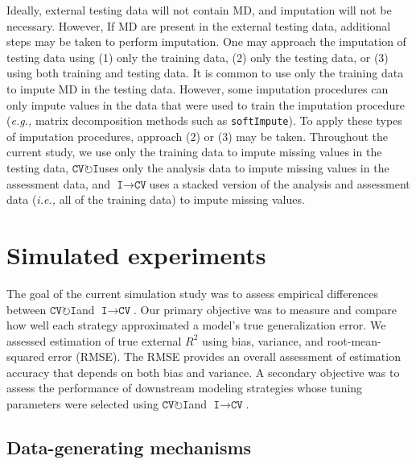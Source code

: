 \documentclass[AMA,STIX1COL,doublespace]{WileyNJD-v2}
\begin{document}
Ideally, external testing data will not contain MD, and imputation will
not be necessary. However, If MD are present in the external testing
data, additional steps may be taken to perform imputation. One may
approach the imputation of testing data using (1) only the training
data, (2) only the testing data, or (3) using both training and testing
data. It is common to use only the training data to impute MD in the
testing data. However, some imputation procedures can only impute values
in the data that were used to train the imputation procedure
(\textit{e.g., }matrix decomposition methods such as
\texttt{softImpute}).\citep{softImpute} To apply these types of
imputation procedures, approach (2) or (3) may be taken. Throughout the
current study, we use only the training data to impute missing values in
the testing data,
$\texttt{CV}\!\circlearrowright\!\texttt{I}$\space uses only the
analysis data to impute missing values in the assessment data, and
$\texttt{I}\!\!\rightarrow\!\texttt{CV}$\space uses a stacked version of
the analysis and assessment data (\textit{i.e., }all of the training
data) to impute missing values.

\section{Simulated experiments} \label{sec:sim}

The goal of the current simulation study was to assess empirical
differences between
$\texttt{CV}\!\circlearrowright\!\texttt{I}$\space and
$\texttt{I}\!\!\rightarrow\!\texttt{CV}$. Our primary objective was to
measure and compare how well each strategy approximated a model's true
generalization error. We assessed estimation of true external \(R^2\)
using bias, variance, and root-mean-squared error (RMSE). The RMSE
provides an overall assessment of estimation accuracy that depends on
both bias and variance. A secondary objective was to assess the
performance of downstream modeling strategies whose tuning parameters
were selected using
$\texttt{CV}\!\circlearrowright\!\texttt{I}$\space and
$\texttt{I}\!\!\rightarrow\!\texttt{CV}$.

\subsection{Data-generating mechanisms} \label{subsec:data_gen}
\end{document}
